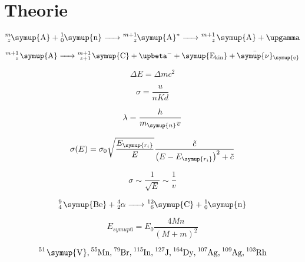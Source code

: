 \section{Theorie}

\begin{equation}
   \ce{^m_z\symup{A} + ^1_0\symup{n} -> ^{m+1}_z\symup{A}^{\ast} -> ^{m+1}_z \symup{A} + \upgamma } \nonumber
\end{equation}

\begin{equation}
   \ce{^{m+1}_z \symup{A} -> ^{m+1}_{z+1} \symup{C} + \upbeta^- + \symup{E_{kin}} + \bar{\symup{\nu}}_{\symup{e}}} \nonumber
\end{equation}

\begin{equation}
   \Delta E = \Delta m c^2 \nonumber
\end{equation}

\begin{equation}
   \sigma = \frac{u}{nKd} \nonumber
\end{equation}

\begin{equation}
   \lambda = \frac{h}{m_{\symup{n}}v} \nonumber
\end{equation}

\begin{equation}
   \sigma(E) = \sigma_0 \sqrt{ \frac{E_{\symup{r_i}}}{E} } \frac{\tilde{c}}{\left( E - E_{\symup{r_i}} \right)^2 + \tilde{c}} \nonumber
\end{equation}

\begin{equation}
   \sigma \sim \frac{1}{\sqrt{E}} \sim \frac{1}{v} \nonumber
\end{equation}

\begin{equation}
   \ce{ ^9_4 \symup{Be} + ^4_2$\alpha$ -> ^{12}_6\symup{C} + ^1_0\symup{n}} \nonumber
\end{equation}

\begin{equation}
   E_{symup{ü}}  = E_0 \frac{4Mn}{\left( M + m \right)^2} \nonumber
\end{equation}

\begin{equation}
   \ce{^{51} \symup{V}, ^{55}\text{Mn}, ^{79}\text{Br}, ^{115}\text{In}, ^{127}\text{J}, ^{164}\text{Dy}, ^{107}{Ag}, ^{109}\text{Ag}, ^{103}\text{Rh}} \nonumber
\end{equation}

